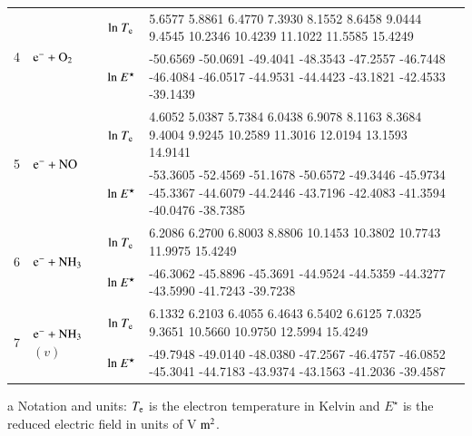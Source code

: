 \begin{table}[!htbp]
\begin{threeparttable}
\begin{tabular*}{\textwidth}{l@{\extracolsep{\fill}}lcll}
  \multirow{2}{*}{4} &  \multirow{2}{*}{ $\rm e^- + O_2  $   } & ${\rm ln}~T_{\rm e}$  & \tiny     5.6577    5.8861    6.4770    7.3930    8.1552    8.6458    9.0444    9.4545   10.2346   10.4239   11.1022   11.5585   15.4249
  \\
  &  & ${\rm ln}~E^\star$     & \tiny    -50.6569  -50.0691  -49.4041  -48.3543  -47.2557  -46.7448  -46.4084  -46.0517  -44.9531  -44.4423  -43.1821  -42.4533  -39.1439
  \\     
  \midrule  
  
  \multirow{2}{*}{5} &  \multirow{2}{*}{ $\rm e^- + NO  $   } & ${\rm ln}~T_{\rm e}$  & \tiny    4.6052    5.0387    5.7384    6.0438    6.9078    8.1163    8.3684    9.4004    9.9245   10.2589   11.3016   12.0194   13.1593   14.9141
 \\
  &  & ${\rm ln}~E^\star$     & \tiny    -53.3605  -52.4569  -51.1678  -50.6572  -49.3446  -45.9734  -45.3367  -44.6079  -44.2446  -43.7196  -42.4083  -41.3594  -40.0476  -38.7385
  \\     
  \midrule  
        
  \multirow{2}{*}{6} &  \multirow{2}{*}{ $\rm e^- + NH_3  $   } & ${\rm ln}~T_{\rm e}$  & \tiny 6.2086    6.2700    6.8003    8.8806   10.1453   10.3802   10.7743   11.9975   15.4249   \\
  
  &  & ${\rm ln}~E^\star$     & \tiny   -46.3062  -45.8896  -45.3691  -44.9524  -44.5359  -44.3277  -43.5990  -41.7243  -39.7238  \\
    \midrule  
  \multirow{2}{*}{7} &  \multirow{2}{*}{ $\rm e^- + NH_3$$(v)$   } & ${\rm ln}~T_{\rm e}$  & \tiny     6.1332    6.2103    6.4055    6.4643    6.5402    6.6125    7.0325    9.3651   10.5660   10.9750   12.5994   15.4249
  \\
  
  &  & ${\rm ln}~E^\star$     & \tiny     -49.7948  -49.0140  -48.0380  -47.2567  -46.4757  -46.0852  -45.3041  -44.7183  -43.9374  -43.1563  -41.2036  -39.4587
  \\  
                       
    \bottomrule
    \end{tabular*}
\begin{tablenotes}
\item[{a}] Notation and units: $T_{\rm e}$ is the electron temperature in Kelvin and $E^\star$ is the reduced electric field in units of V$\rm ~m^2$.
\end{tablenotes}
   \end{threeparttable}
\end{table}
